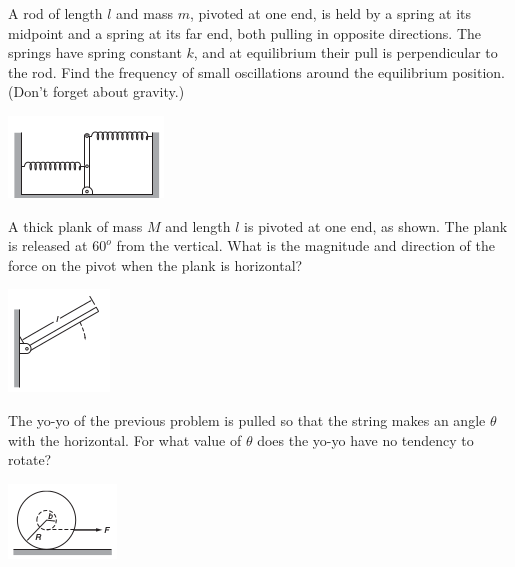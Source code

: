 \documentclass[12pt,letterpaper]{hmcpset}
\newcommand{\dg}[1]{\ensuremath{#1^o}}
\begin{document}



\begin{problem}
A rod of length $l$ and mass $m$, pivoted at one end, is held by a spring at
its midpoint and a spring at its far end, both pulling in opposite
directions. The springs have spring constant $k$, and at equilibrium their
pull is perpendicular to the rod. Find the frequency of small oscillations
around the equilibrium position. (Don't forget about gravity.)
\begin{center}
    \includegraphics{img/7_17}
\end{center}
\end{problem}
\begin{solution}
    \vfill
\end{solution}
\clearpage

\begin{problem}
A thick plank of mass $M$ and length $l$ is pivoted at one end, as shown. The
plank is released at $\dg{60}$ from the vertical. What is the magnitude and
direction of the force on the pivot when the plank is horizontal?
\begin{center}
    \includegraphics{img/7_20}
\end{center}
\end{problem}
\begin{solution}
    \vfill
\end{solution}
\clearpage

\begin{problem}
The yo-yo of the previous problem is pulled so that the string makes an angle
$\theta$ with the horizontal. For what value of $\theta$ does the yo-yo have
no tendency to rotate?
\begin{center}
    \includegraphics{img/7_28}
\end{center}
\end{problem}
\begin{solution}
    \vfill
\end{solution}
\clearpage
\end{document}
